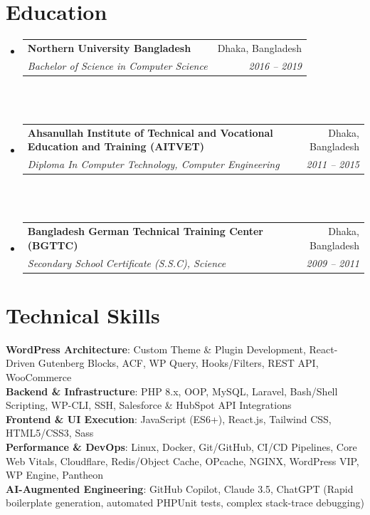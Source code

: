 \documentclass[letterpaper,11pt]{article}
\makeatletter
\newcommand{\resumeSubheading}[4]{
  \vspace{-2pt}\item
    \begin{tabular*}{0.97\textwidth}[t]{l@{\extracolsep{\fill}}r}
      \textbf{#1} & #2 \\
      \textit{\small#3} & \textit{\small #4} \\
    \end{tabular*}\vspace{-7pt}
}
\newcommand{\resumeSubHeadingListStart}{\begin{itemize}[leftmargin=0.15in, label={}]}
\newcommand{\resumeSubHeadingListEnd}{\end{itemize}\vspace{4pt}}
\makeatother
\begin{document}
\section{Education}
  \resumeSubHeadingListStart
    \resumeSubheading
      {Northern University Bangladesh}{Dhaka, Bangladesh} 
      {Bachelor of Science in Computer Science}{2016 -- 2019} 
      \\\\
    \resumeSubheading
      {Ahsanullah Institute of Technical and Vocational Education and Training (AITVET)}{Dhaka, Bangladesh} 
      {Diploma In Computer Technology, Computer Engineering}{2011 -- 2015} 
      \\\\
    \resumeSubheading
      {Bangladesh German Technical Training Center (BGTTC)}{Dhaka, Bangladesh} 
      {Secondary School Certificate (S.S.C), Science}{2009 -- 2011} 
  \resumeSubHeadingListEnd

\section{Technical Skills}
 \begin{itemize}[leftmargin=0.15in, label={}]
    \small{\item{
     \textbf{WordPress Architecture}{: Custom Theme \& Plugin Development, React-Driven Gutenberg Blocks, ACF, WP Query, Hooks/Filters, REST API, WooCommerce} \\ 
     \textbf{Backend \& Infrastructure}{: PHP 8.x, OOP, MySQL, Laravel, Bash/Shell Scripting, WP-CLI, SSH, Salesforce \& HubSpot API Integrations} \\ 
     \textbf{Frontend \& UI Execution}{: JavaScript (ES6+), React.js, Tailwind CSS, HTML5/CSS3, Sass} \\ 
     \textbf{Performance \& DevOps}{: Linux, Docker, Git/GitHub, CI/CD Pipelines, Core Web Vitals, Cloudflare, Redis/Object Cache, OPcache, NGINX, WordPress VIP, WP Engine, Pantheon} \\ 
     \textbf{AI-Augmented Engineering}{: GitHub Copilot, Claude 3.5, ChatGPT (Rapid boilerplate generation, automated PHPUnit tests, complex stack-trace debugging)} 
    }}
 \end{itemize}


\end{document}
